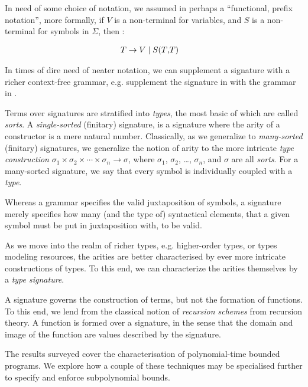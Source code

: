 In need of some choice of notation, we assumed in 
perhaps a ``functional, prefix notation'', more formally, if $V$ is a non-terminal for variables, and $S$ is a non-terminal for symbols in $\Sigma$, then :

\begin{align*}
T &\rightarrow V \mid S \mathtt{(} T \mathtt{,} T \mathtt{)}
\end{align*}

In times of dire need of neater notation, we can supplement a signature with a
richer context-free grammar, e.g. supplement the signature in
 with the grammar in .

Terms over signatures are stratified into \emph{types}, the most basic of which
are called \emph{sorts}. A \emph{single-sorted} (finitary) signature, is a
signature where the arity of a constructor is a mere natural number.
Classically, as we generalize to \emph{many-sorted} (finitary) signatures, we
generalize the notion of arity to the more intricate \emph{type construction}
$\sigma_1 \times \sigma_2 \times \cdots \times \sigma_n \rightarrow \sigma$,
where $\sigma_1$, $\sigma_2$, \ldots, $\sigma_n$, and $\sigma$ are all
\emph{sorts}. For a many-sorted signature, we say that every symbol is
individually coupled with a \emph{type}.
 


Whereas a grammar specifies the valid juxtaposition of symbols, a signature
merely specifies how many (and the type of) syntactical elements, that a given
symbol must be put in juxtaposition with, to be valid.


As we move into the realm of richer types, e.g. higher-order types, or types
modeling resources, the arities are better characterised by ever more intricate
constructions of types. To this end, we can characterize the arities themselves
by a \emph{type signature}.


A signature governs the construction of terms, but not the formation of
functions. To this end, we lend from the classical notion of \emph{recursion
schemes} from recursion theory. A function is formed over a signature, in the
sense that the domain and image of the function are values described by the
signature.

The results surveyed cover the characterisation of polynomial-time bounded
programs. We explore how a couple of these techniques may be specialised
further to specify and enforce subpolynomial bounds.


